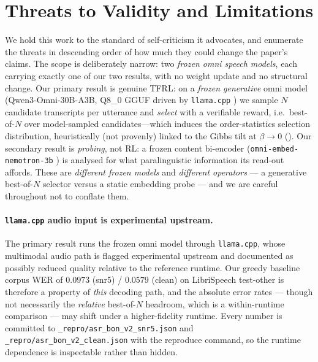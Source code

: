 \section{Threats to Validity and Limitations}
\label{sec:threats}

We hold this work to the standard of self-criticism it advocates, and enumerate the threats in
descending order of how much they could change the paper's claims. The scope is deliberately narrow:
two \emph{frozen omni speech models}, each carrying exactly one of our two results, with no weight
update and no structural change. Our primary result is genuine TFRL: on a \emph{frozen
generative} omni model (Qwen3-Omni-30B-A3B, Q8\_0 GGUF driven by \texttt{llama.cpp}
\citep{qwen3omni}) we sample $N$ candidate transcripts per utterance and \emph{select} with a
verifiable reward, i.e.\ best-of-$N$ over model-sampled candidates---which induces the order-statistics
selection distribution, heuristically (not provenly) linked to the Gibbs tilt at $\beta\to0$
(). Our secondary result is
\emph{probing}, not RL: a frozen content bi-encoder (\texttt{omni-embed-nemotron-3b}
\citep{omniembed2025}) is analysed for what paralinguistic information its read-out affords. These are
\emph{different frozen models} and \emph{different operators} --- a generative best-of-$N$ selector
versus a static embedding probe --- and we are careful throughout not to conflate them.

\paragraph{\texttt{llama.cpp} audio input is experimental upstream.}
The primary result runs the frozen omni model through \texttt{llama.cpp}, whose multimodal audio path
is flagged experimental upstream and documented as possibly reduced quality relative to the reference
runtime. Our greedy baseline corpus WER of $0.0973$ (snr5) / $0.0579$ (clean) on LibriSpeech test-other
is therefore a property of \emph{this} decoding path, and the absolute error rates --- though not
necessarily the \emph{relative} best-of-$N$ headroom, which is a within-runtime comparison --- may shift
under a higher-fidelity runtime. Every number is committed to \texttt{\_repro/asr\_bon\_v2\_snr5.json}
and \texttt{\_repro/asr\_bon\_v2\_clean.json} with the reproduce command, so the runtime dependence is
inspectable rather than hidden.

